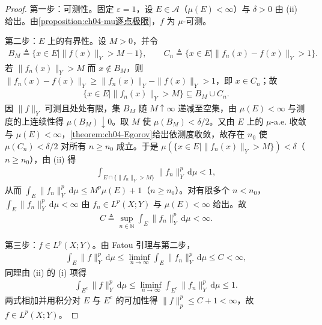 \documentclass[../../main.tex]{subfiles}%
\begin{document}
\begin{proof}
第一步：可测性。固定 $\varepsilon=1$，设 $E\in\mathcal{A}$（$\mu(E)<\infty$）与 $\delta>0$ 由 (ii) 给出。由\cref{proposition:ch04-mu逐点极限}，$f$ 为 $\mu$-可测。

第二步：$E$ 上的有界性。设 $M>0$，并令
\begin{align*}
B_M\triangleq\{x\in E\mid\|f(x)\|_Y>M-1\},\qquad C_n\triangleq\{x\in E\mid\|f_n(x)-f(x)\|_Y>1\}.
\end{align*}
若 $\|f_n(x)\|_Y>M$ 而 $x\notin B_M$，则 $\|f_n(x)-f(x)\|_Y\geqslant\|f_n(x)\|_Y-\|f(x)\|_Y>1$，即 $x\in C_n$；故
\begin{align*}
\{x\in E\mid\|f_n(x)\|_Y>M\}\subseteq B_M\cup C_n .
\end{align*}
因 $\|f\|_Y$ 可测且处处有限，集 $B_M$ 随 $M\uparrow\infty$ 递减至空集，由 $\mu(E)<\infty$ 与测度的上连续性得 $\mu(B_M)\downarrow0$。取 $M$ 使 $\mu(B_M)<\delta/2$。又由 $E$ 上的 $\mu$-a.e. 收敛与 $\mu(E)<\infty$，\cref{theorem:ch04-Egorov}给出依测度收敛，故存在 $n_0$ 使 $\mu(C_n)<\delta/2$ 对所有 $n\geqslant n_0$ 成立。于是 $\mu(\{x\in E\mid\|f_n(x)\|_Y>M\})<\delta$（$n\geqslant n_0$），由 (ii) 得
\begin{align*}
\int_{E\cap\{\|f_n\|_Y>M\}}\|f_n\|_Y^p\,\mathrm{d}\mu<1,
\end{align*}
从而 $\int_E\|f_n\|_Y^p\,\mathrm{d}\mu\leqslant M^p\mu(E)+1$（$n\geqslant n_0$）。对有限多个 $n<n_0$，$\int_E\|f_n\|_Y^p\,\mathrm{d}\mu<\infty$ 由 $f_n\in L^p(X;Y)$ 与 $\mu(E)<\infty$ 给出。故
\begin{align*}
C\triangleq\sup_{n\in\mathbb{N}}\int_E\|f_n\|_Y^p\,\mathrm{d}\mu<\infty .
\end{align*}

第三步：$f\in L^p(X;Y)$。由 Fatou 引理与第二步，
\begin{align*}
\int_E\|f\|_Y^p\,\mathrm{d}\mu\leqslant\liminf_{n\to\infty}\int_E\|f_n\|_Y^p\,\mathrm{d}\mu\leqslant C<\infty,
\end{align*}
同理由 (ii) 的 (i) 项得
\begin{align*}
\int_{E^c}\|f\|_Y^p\,\mathrm{d}\mu\leqslant\liminf_{n\to\infty}\int_{E^c}\|f_n\|_Y^p\,\mathrm{d}\mu\leqslant1.
\end{align*}
两式相加并用积分对 $E$ 与 $E^c$ 的可加性得 $\|f\|_p^p\leqslant C+1<\infty$，故 $f\in L^p(X;Y)$。


\end{proof}
\end{document}
